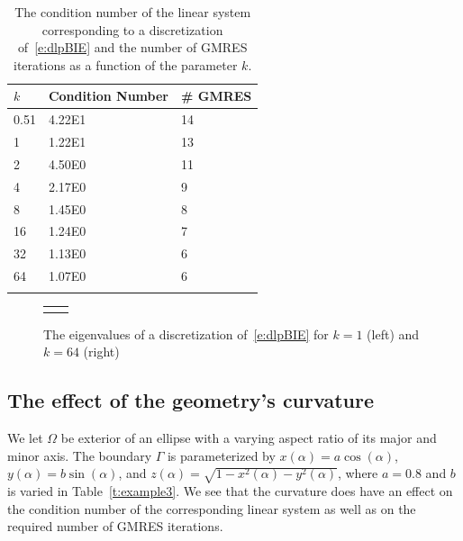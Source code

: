 \begin{table}[htps]
\caption{\label{t:example2} The condition number of the linear system
corresponding to a discretization of~\eqref{e:dlpBIE} and the number of
GMRES iterations as a function of the parameter $k$.}
\centering
\begin{tabular*}{0.8\textwidth}{@{\extracolsep{\fill}}lll}
$k$ & Condition Number & \# GMRES \\
\hline\noalign{\smallskip}
0.51 & 4.22E1 & 14 \\
1    & 1.22E1 & 13 \\
2    & 4.50E0 & 11 \\
4    & 2.17E0 & 9  \\
8    & 1.45E0 & 8  \\  
16   & 1.24E0 & 7  \\ 
32   & 1.13E0 & 6  \\
64   & 1.07E0 & 6  \\
\noalign{\smallskip}\hline
\end{tabular*}
\end{table}

\begin{figure}[htps]
\centering
\begin{tabular}{cc}
 &

\end{tabular}
\caption{\label{f:evalues} The eigenvalues of a discretization
of~\eqref{e:dlpBIE} for $k=1$ (left) and $k=64$ (right)}
\end{figure}


\subsection{The effect of the geometry's curvature}
We let $\Omega$ be exterior of an ellipse with a varying aspect ratio of
its major and minor axis.  The boundary $\Gamma$ is parameterized by
$x(\alpha) = a\cos(\alpha)$, $y(\alpha) = b\sin(\alpha)$, and $z(\alpha)
= \sqrt{1-x^{2}(\alpha)-y^{2}(\alpha)}$, where $a = 0.8$ and $b$ is
varied in Table~\ref{t:example3}.  We see that the curvature does have
an effect on the condition number of the corresponding linear system as
well as on the required number of GMRES iterations.


